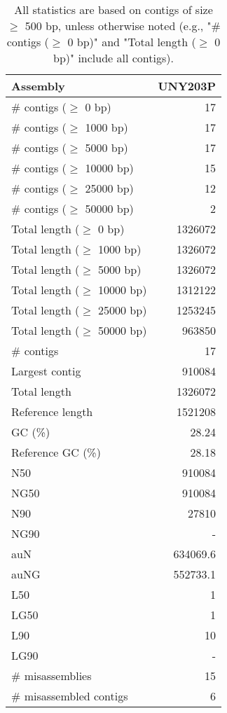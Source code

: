 \documentclass[12pt,a4paper]{article}
\begin{document}
\begin{table}[ht]
\begin{center}
\caption{All statistics are based on contigs of size $\geq$ 500 bp, unless otherwise noted (e.g., "\# contigs ($\geq$ 0 bp)" and "Total length ($\geq$ 0 bp)" include all contigs).}
\begin{tabular}{|l*{1}{|r}|}
\hline
Assembly & UNY203P \\ \hline
\# contigs ($\geq$ 0 bp) & 17 \\ \hline
\# contigs ($\geq$ 1000 bp) & 17 \\ \hline
\# contigs ($\geq$ 5000 bp) & 17 \\ \hline
\# contigs ($\geq$ 10000 bp) & 15 \\ \hline
\# contigs ($\geq$ 25000 bp) & 12 \\ \hline
\# contigs ($\geq$ 50000 bp) & 2 \\ \hline
Total length ($\geq$ 0 bp) & 1326072 \\ \hline
Total length ($\geq$ 1000 bp) & 1326072 \\ \hline
Total length ($\geq$ 5000 bp) & 1326072 \\ \hline
Total length ($\geq$ 10000 bp) & 1312122 \\ \hline
Total length ($\geq$ 25000 bp) & 1253245 \\ \hline
Total length ($\geq$ 50000 bp) & 963850 \\ \hline
\# contigs & 17 \\ \hline
Largest contig & 910084 \\ \hline
Total length & 1326072 \\ \hline
Reference length & 1521208 \\ \hline
GC (\%) & 28.24 \\ \hline
Reference GC (\%) & 28.18 \\ \hline
N50 & 910084 \\ \hline
NG50 & 910084 \\ \hline
N90 & 27810 \\ \hline
NG90 & - \\ \hline
auN & 634069.6 \\ \hline
auNG & 552733.1 \\ \hline
L50 & 1 \\ \hline
LG50 & 1 \\ \hline
L90 & 10 \\ \hline
LG90 & - \\ \hline
\# misassemblies & 15 \\ \hline
\# misassembled contigs & 6 \\ \hline

\end{tabular}
\end{center}
\end{table}
\end{document}

